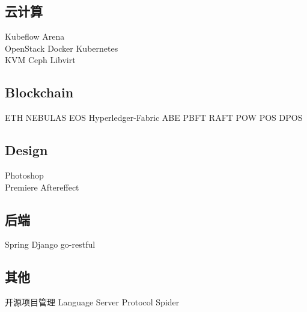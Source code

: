\documentclass[]{deedy-resume-openfont}
\begin{document}
\begin{minipage}[t]{0.3\textwidth}
\subsection{云计算}
Kubeflow \textbullet{} Arena  \\
OpenStack \textbullet{} Docker \textbullet{} Kubernetes \\
KVM \textbullet{} Ceph \textbullet{} Libvirt \\
\sectionsep

\subsection{Blockchain}
ETH \textbullet{} NEBULAS \textbullet{} EOS \textbullet{} Hyperledger-Fabric \textbullet{} ABE \textbullet{} PBFT \textbullet{} RAFT \textbullet{} POW \textbullet{} POS \textbullet{} DPOS \\
\sectionsep

\subsection{Design}
Photoshop \\
Premiere \textbullet{} Aftereffect \\
\sectionsep

\subsection{后端}
Spring \textbullet{} Django \textbullet{} go-restful \\
\sectionsep

\subsection{其他}
开源项目管理 \textbullet{} Language Server Protocol \textbullet{} Spider \\
\sectionsep

\end{minipage}
\hfill
\begin{minipage}[t]{0.68\textwidth}

%
%

\end{minipage}
\hfill
\end{document}
